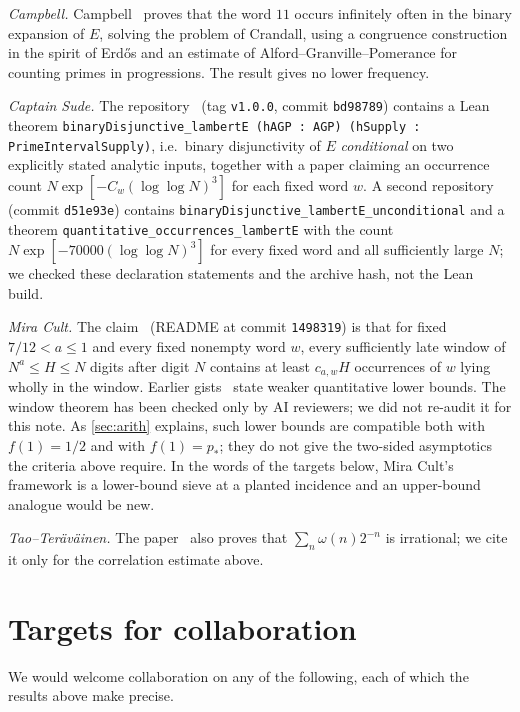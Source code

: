 \documentclass[11pt]{article}
\begin{document}
\emph{Campbell.} Campbell~\cite{campbell2026} proves that the word $11$ occurs infinitely often in the binary expansion of $E$, solving the problem of Crandall, using a congruence construction in the spirit of Erd\H{o}s and an estimate of Alford--Granville--Pomerance for counting primes in progressions. The result gives no lower frequency.

\emph{Captain Sude.} The repository~\cite{sude1} (tag \texttt{v1.0.0}, commit \texttt{bd98789}) contains a Lean theorem \texttt{binaryDisjunctive\_lambertE (hAGP : AGP) (hSupply : PrimeIntervalSupply)}, i.e.\ binary disjunctivity of $E$ \emph{conditional} on two explicitly stated analytic inputs, together with a paper claiming an occurrence count $N\exp[-C_w(\log\log N)^3]$ for each fixed word $w$. A second repository~\cite{sude2} (commit \texttt{d51e93e}) contains \texttt{binaryDisjunctive\_lambertE\_unconditional} and a theorem \texttt{quantitative\_occurrences\_lambertE} with the count $N\exp[-70000(\log\log N)^3]$ for every fixed word and all sufficiently large $N$; we checked these declaration statements and the archive hash, not the Lean build.

\emph{Mira Cult.} The claim~\cite{mira} (README at commit \texttt{1498319}) is that for fixed $7/12<a\le1$ and every fixed nonempty word $w$, every sufficiently late window of $N^a\le H\le N$ digits after digit $N$ contains at least $c_{a,w}H$ occurrences of $w$ lying wholly in the window. Earlier gists~\cite{miragist} state weaker quantitative lower bounds. The window theorem has been checked only by AI reviewers; we did not re-audit it for this note. As \cref{sec:arith} explains, such lower bounds are compatible both with $f(1)=1/2$ and with $f(1)=p_*$; they do not give the two-sided asymptotics the criteria above require. In the words of the targets below, Mira Cult's framework is a lower-bound sieve at a planted incidence and an upper-bound analogue would be new.

\emph{Tao--Ter\"av\"ainen.} The paper~\cite{tt2025} also proves that $\sum_n\omega(n)2^{-n}$ is irrational; we cite it only for the correlation estimate above.

\section{Targets for collaboration}\label{sec:targets}

We would welcome collaboration on any of the following, each of which the results above make precise.
\end{document}
